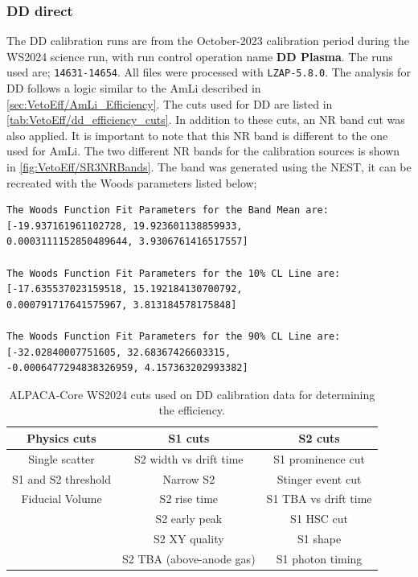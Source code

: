 \subsubsection{DD direct}
The DD calibration runs are from the October-2023 calibration period during the WS2024 science run, with run control operation name \textbf{DD Plasma}.
The runs used are; \lstinline{14631-14654}.
All files were processed with \lstinline{LZAP-5.8.0}.
The analysis for DD follows a logic similar to the AmLi described in \autoref{sec:VetoEff/AmLi_Efficiency}.
The cuts used for DD are listed in \autoref{tab:VetoEff/dd_efficiency_cuts}.
In addition to these cuts, an NR band cut was also applied.
It is important to note that this NR band is different to the one used for AmLi. The two different NR bands for the calibration sources is shown in \autoref{fig:VetoEff/SR3NRBands}.
The band was generated using the NEST, it can be recreated with the Woods parameters listed below;
\begin{lstlisting}[backgroundcolor = \color{lightgray}]
The Woods Function Fit Parameters for the Band Mean are:
[-19.937161961102728, 19.923601138859933,
0.0003111152850489644, 3.9306761416517557]

The Woods Function Fit Parameters for the 10% CL Line are:
[-17.635537023159518, 15.192184130700792,
0.000791717641575967, 3.813184578175848]

The Woods Function Fit Parameters for the 90% CL Line are:
[-32.02840007751605, 32.68367426603315,
-0.0006477294838326959, 4.157363202993382]
\end{lstlisting}
\begin{table}[!ht]
	\centering
	\begin{tabular}{|c|c|c|}
    \hline
	\textbf{Physics cuts}&\textbf{ S1 cuts}&\textbf{S2 cuts} \\
	\hline
	Single scatter & S2 width vs drift time & S1 prominence cut \\
	S1 and S2 threshold & Narrow S2 & Stinger event cut \\
	Fiducial Volume & S2 rise time & S1 TBA vs drift time \\
	& S2 early peak & S1 HSC cut \\
	& S2 XY quality & S1 shape \\
	& S2 TBA (above-anode gas) & S1 photon timing \\
    \hline
	\end{tabular}
	\caption{ALPACA-Core WS2024 cuts used on DD calibration data for determining the efficiency.}
	\label{tab:VetoEff/dd_efficiency_cuts}
\end{table}
